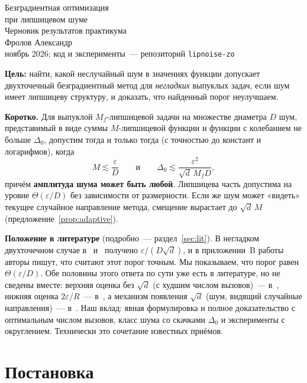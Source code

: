 \documentclass[12pt,a4paper]{article}
\theoremstyle{plain}
\theoremstyle{definition}
\theoremstyle{remark}
\newcommand{\eps}{\varepsilon}
\begin{document}
\begin{center}
{\LARGE Безградиентная оптимизация\\[4pt] при липшицевом шуме}\\[10pt]
{\large Черновик результатов практикума}\\[8pt]
Фролов Александр\\[2pt]
{\small ноябрь 2026; код и эксперименты~--- репозиторий \texttt{lipnoise-zo}}
\end{center}

\noindent\textbf{Цель:} найти, какой неслучайный шум в значениях функции допускает двухточечный безградиентный метод для \emph{негладких} выпуклых задач, если шум имеет липшицеву структуру, и доказать, что найденный порог неулучшаем.

\medskip
\noindent\textbf{Коротко.} Для выпуклой $M_f$-липшицевой задачи на множестве диаметра $D$ шум, представимый в виде суммы $M$-липшицевой функции и функции с колебанием не больше $\Delta_0$, допустим тогда и только тогда (с точностью до констант и логарифмов), когда
\begin{equation}\label{eq:region}
  M\lesssim\frac\eps D\qquad\text{и}\qquad\Delta_0\lesssim\frac{\eps^2}{\sqrt d\,M_fD},
\end{equation}
причём \textbf{амплитуда шума может быть любой}. Липшицева часть допустима на уровне $\Theta(\eps/D)$ без зависимости от размерности. Если же шум может «видеть» текущее случайное направление метода, смещение вырастает до $\sqrt d\,M$ (предложение~\ref{prop:adaptive}).

\medskip
\noindent\textbf{Положение в литературе} (подробно~--- раздел~\ref{sec:lit}). В негладком двухточечном случае в~\cite{DTTG23} и~\cite{LG24} получено $\eps/(D\sqrt d)$, и в приложении~B работы~\cite{DTTG23} авторы пишут, что считают этот порог точным. Мы показываем, что порог равен $\Theta(\eps/D)$. Обе половины этого ответа по сути уже есть в литературе, но не сведены вместе: верхняя оценка без $\sqrt d$ (с худшим числом вызовов)~--- в~\cite[разд.~4]{GDN16}, нижняя оценка $2\eps/R$~--- в~\cite[предложение~E.7]{LDT26}, а механизм появления $\sqrt d$ (шум, видящий случайные направления)~--- в~\cite[замечание~D.5]{LDT26}. Наш вклад: явная формулировка и полное доказательство с оптимальным числом вызовов, класс шума со скачками $\Delta_0$ и эксперименты с округлением. Технически это сочетание известных приёмов.

\section{Постановка}
\end{document}
